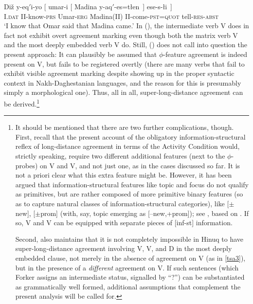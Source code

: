 \documentclass[output=paper
,modfonts
,nonflat]{langsci/langscibook}
\begin{document}
	\ea\label{ex:mueller:36} 
	\gll Di\v{z} \label{tsa3}y-eq$'$i-yo [ \textglotstop umar-i [ Madina  y-aq$'$-es=t\l en~] ese-s-\l i~]\\
	I.{\scshape dat} II-know-{\scshape prs} {} Umar-{\scshape erg} {} Madina(II) II-come-{\scshape pst}={\scshape quot} tell-{\scshape res}-{\scshape abst}\\
	\glt `I know that Omar said that Madina came.'
	\z
	In (\Last), the intermediate verb V does in fact not exhibit overt
	agreement marking even though both the matrix verb V and the most
	deeply embedded verb V do. Still, (\Last) does not call into question
	the present approach: It can plausibly be assumed that $\phi$-feature
	agreement is indeed present on V, but fails to be registered overtly
	(there are many verbs that fail to exhibit visible agreement marking
	despite showing up in the proper syntactic context in
	Nakh-Daghestanian languages, and the reason for this is presumably
	simply a morphological one). Thus, all in all, super-long-distance
	agreement can be derived.\footnote{It should be mentioned that there
		are two further complications, though. First, recall that the
		present account of the obligatory information-structural reflex of
		long-distance agreement in terms of the Activity Condition would,
		strictly speaking, require two different additional features (next
		to the $\phi$-probes) on V and V, and not just one, as in the
		cases discussed so far. It is not a priori clear what
		this extra feature might be. However, it has been argued that
		information-structural features like topic and focus do not qualify
		as primitives, but are rather composed of more primitive binary
		features (so as to capture natural classes of information-structural
		categories), like [$\pm$new], [$\pm$prom] (with, say, topic emerging
		as [--new,+prom]); see \citet{Choi:99}, based on
		\citet{Vallduvi:92}. If so, V and V can be equipped with
		separate pieces of [inf-st] information.
		
		Second, \citet{Forker:11} also maintains that it is not completely
		impossible in Hinuq to have super-long-distance agreement involving
		V, V, and D in the most deeply embedded clause, not merely
		in the absence of agreement on V (as in \ref{tsa3}), but in the presence of a {\it
			different} agreement on V.  If such sentences (which  Forker assigns
		an intermediate status, signalled by ``?'') can be substantiated as
		grammatically well formed, additional assumptions that complement the
		present analysis will be called for.}
	
\end{document}
